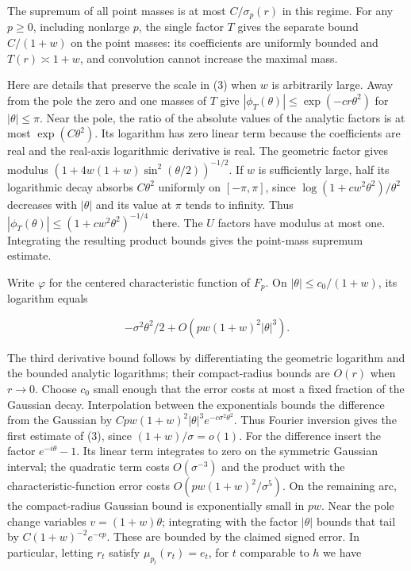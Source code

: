 \documentclass[11pt]{article}
\begin{document}
The supremum of all point masses is at most \(C/\sigma_p(r)\) in this regime. For any \(p\ge0\), including nonlarge \(p\), the single factor \(T\) gives the separate bound \(C/(1+w)\) on the point masses: its coefficients are uniformly bounded and \(T(r)\asymp1+w\), and convolution cannot increase the maximal mass.

Here are details that preserve the scale in (3) when \(w\) is arbitrarily large. Away from the pole the zero and one masses of \(T\) give \(|\phi_T(\theta)|\le \exp(-cr\theta^2)\) for \(|\theta|\le\pi\). Near the pole, the ratio of the absolute values of the analytic factors is at most \(\exp(C\theta^2)\). Its logarithm has zero linear term because the coefficients are real and the real-axis logarithmic derivative is real. The geometric factor gives modulus \((1+4w(1+w)\sin^2(\theta/2))^{-1/2}\). If \(w\) is sufficiently large, half its logarithmic decay absorbs \(C\theta^2\) uniformly on \([-\pi,\pi]\), since \(\log(1+c w^2\theta^2)/\theta^2\) decreases with \(|\theta|\) and its value at \(\pi\) tends to infinity. Thus \(|\phi_T(\theta)|\le (1+c w^2\theta^2)^{-1/4}\) there. The \(U\) factors have modulus at most one. Integrating the resulting product bounds gives the point-mass supremum estimate.

Write \(\varphi\) for the centered characteristic function of \(F_p\). On \(|\theta|\le c_0/(1+w)\), its logarithm equals

\begin{equation*}
-\sigma^2\theta^2/2+O(pw(1+w)^2|\theta|^3).
\end{equation*}

The third derivative bound follows by differentiating the geometric logarithm and the bounded analytic logarithms; their compact-radius bounds are \(O(r)\) when \(r\to0\). Choose \(c_0\) small enough that the error costs at most a fixed fraction of the Gaussian decay. Interpolation between the exponentials bounds the difference from the Gaussian by \(Cpw(1+w)^2|\theta|^3 e^{-c\sigma^2\theta^2}\). Thus Fourier inversion gives the first estimate of (3), since \((1+w)/\sigma=o(1)\). For the difference insert the factor \(e^{-i\theta}-1\). Its linear term integrates to zero on the symmetric Gaussian interval; the quadratic term costs \(O(\sigma^{-3})\) and the product with the characteristic-function error costs \(O(pw(1+w)^2/\sigma^5)\). On the remaining arc, the compact-radius Gaussian bound is exponentially small in \(pw\). Near the pole change variables \(v=(1+w)\theta\); integrating with the factor \(|\theta|\) bounds that tail by \(C(1+w)^{-2}e^{-cp}\). These are bounded by the claimed signed error. In particular, letting \(r_t\) satisfy \(\mu_{p_t}(r_t)=e_t\), for \(t\) comparable to \(h\) we have
\end{document}
